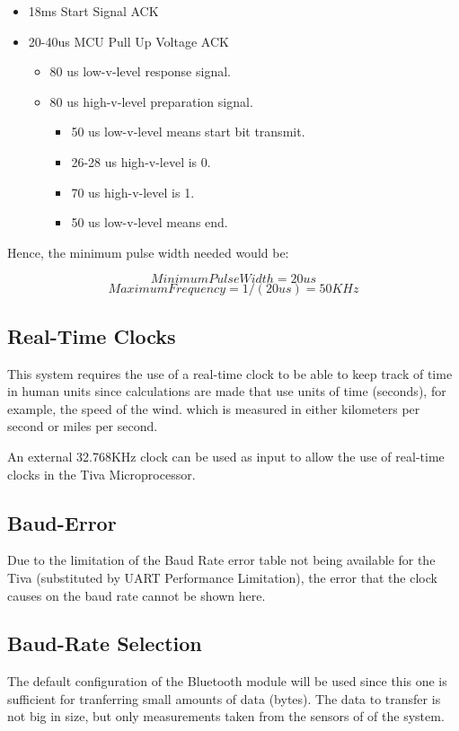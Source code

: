 			\begin{itemize}
				\item 18ms Start Signal ACK
				\item 20-40us MCU Pull Up Voltage ACK
				\begin{itemize}
					\item 80 us low-v-level response signal.
					\item 80 us high-v-level preparation signal.
					\begin{itemize}
						\item 50 us low-v-level means start bit transmit.
						\item 26-28 us high-v-level is 0.
						\item 70 us high-v-level is 1.
						\item 50 us	low-v-level means end.
					\end{itemize}
				\end{itemize}
			\end{itemize}

			Hence, the minimum pulse width needed would be:

			$$ Minimum Pulse Width = 20us $$
			$$ Maximum Frequency = 1/(20us) = 50 KHz $$

	\subsection{Real-Time Clocks}
		This system requires the use of a real-time clock to be able to keep track of time in human units since calculations are made that use units of time (seconds), for example, the speed of the wind. which is measured
		in either kilometers per second or miles per second.

		An external 32.768KHz clock can be used as input to allow the use of real-time clocks in the Tiva Microprocessor.

	\subsection{Baud-Error}
		Due to the limitation of the Baud Rate error table not being available for the Tiva (substituted by UART Performance Limitation), the error that the clock causes on the baud rate cannot be shown here.

	\subsection{Baud-Rate Selection}
		The default configuration of the Bluetooth module will be used since this one is sufficient for tranferring small amounts of data (bytes). The data to transfer is not big in size, but only measurements taken from the sensors of of the system.

